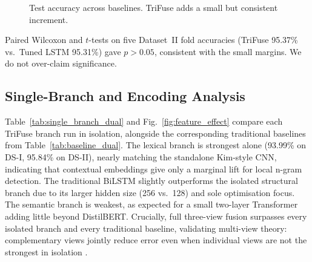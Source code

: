 \documentclass[10pt,twocolumn,a4paper]{article}
\begin{document}
\begin{figure}[!t]
\centering

\caption{Test accuracy across baselines. TriFuse adds a small but consistent increment.}
\label{fig:baseline_comp}
\end{figure}

\begin{table}[!t]
\caption{Stratified 5-fold CV results (mean\,$\pm$\,std, \%).}
\label{tab:kfold_dual}
\centering
{}
\end{table}

Paired Wilcoxon and $t$-tests on five Dataset~II fold accuracies (TriFuse 95.37\% vs.\ Tuned LSTM 95.31\%) gave $p>0.05$, consistent with the small margins. We do not over-claim significance.

\subsection{Single-Branch and Encoding Analysis}\label{subsec:single_branch}

Table~\ref{tab:single_branch_dual} and Fig.~\ref{fig:feature_effect} compare each TriFuse branch run in isolation, alongside the corresponding traditional baselines from Table~\ref{tab:baseline_dual}. The lexical branch is strongest alone (93.99\% on DS-I, 95.84\% on DS-II), nearly matching the standalone Kim-style CNN, indicating that contextual embeddings give only a marginal lift for local n-gram detection. The traditional BiLSTM slightly outperforms the isolated structural branch due to its larger hidden size (256 vs.\ 128) and sole optimisation focus. The semantic branch is weakest, as expected for a small two-layer Transformer adding little beyond DistilBERT. Crucially, full three-view fusion surpasses every isolated branch and every traditional baseline, validating multi-view theory: complementary views jointly reduce error even when individual views are not the strongest in isolation \citep{ref19}.
\end{document}
